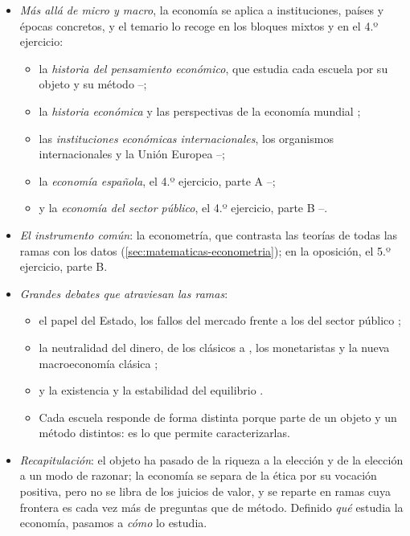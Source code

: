 \documentclass[11pt]{article}
\begin{document}
\begin{itemize}
\item \emph{Más allá de micro y macro}, la economía se aplica a instituciones, países y épocas concretos, y el temario lo recoge en los bloques mixtos y en el 4.º ejercicio:
  \begin{itemize}
  \item la \emph{historia del pensamiento económico}, que estudia cada escuela por su objeto y su método --;
  \item la \emph{historia económica} y las perspectivas de la economía mundial   ;
  \item las \emph{instituciones económicas internacionales}, los organismos internacionales y la Unión Europea   --;
  \item la \emph{economía española}, el 4.º ejercicio, parte A --;
  \item y la \emph{economía del sector público}, el 4.º ejercicio, parte B --.
  \end{itemize}
\item \emph{El instrumento común}: la econometría, que contrasta las teorías de todas las ramas con los datos (\ref{sec:matematicas-econometria}); en la oposición, el 5.º ejercicio, parte B.
\item \emph{Grandes debates que atraviesan las ramas}:
  \begin{itemize}
  \item el papel del Estado, los fallos del mercado frente a los del sector público  ;
  \item la neutralidad del dinero, de los clásicos a , los monetaristas y la nueva macroeconomía clásica   ;
  \item y la existencia y la estabilidad del equilibrio .
  \end{itemize}
  \begin{itemize}
  \item Cada escuela responde de forma distinta porque parte de un objeto y un método distintos: es lo que permite caracterizarlas\nocite{Schumpeter1954History}.
  \end{itemize}
\item \emph{Recapitulación}: el objeto ha pasado de la riqueza a la elección y de la elección a un modo de razonar; la economía se separa de la ética por su vocación positiva, pero no se libra de los juicios de valor, y se reparte en ramas cuya frontera es cada vez más de preguntas que de método. Definido \emph{qué} estudia la economía, pasamos a \emph{cómo} lo estudia.
\end{itemize}
\end{document}
